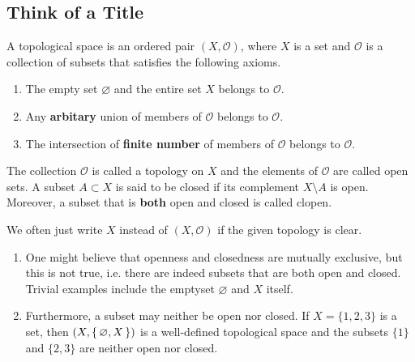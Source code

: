 \subsection{Think of a Title}
\begin{defbox}
    \begin{definition}
        A {\color{maththen}topological space} is an {\color{mathobj}ordered pair} \((X, \mathcal{O})\), where \(X\) is a {\color{mathif}set} and \(\mathcal{O}\) is a {\color{mathif}collection of subsets} that satisfies the following {\color{mathrem}axioms}.
        \begin{enumerate}
            \item The {\color{mathif}empty set} \(\varnothing\) and the {\color{mathif}entire set} \(X\) belongs to \(\mathcal{O}\).
            \item Any \textbf{arbitary} {\color{mathif}union} of members of \(\mathcal{O}\) belongs to \(\mathcal{O}\).
            \item The {\color{mathif}intersection} of \textbf{finite number} of members of \(\mathcal{O}\) belongs to \(\mathcal{O}\).
        \end{enumerate}
        
        The {\color{mathobj}collection} \(\mathcal{O}\) is called a {\color{maththen}topology} on \(X\) and the {\color{mathobj}elements} of \(\mathcal{O}\) are called {\color{maththen}open sets}. A {\color{mathobj}subset} \(A \subset X\) is said to be {\color{maththen}closed} if its {\color{mathif}complement} \(X \setminus A\) is {\color{mathif}open}. Moreover, a {\color{mathobj}subset} that is \textbf{both} {\color{mathif}open} and {\color{mathif}closed} is called {\color{maththen}clopen}.
    \end{definition}
\end{defbox}
%
\begin{rembox}
    \begin{remark}
        We often just write \(X\) instead of \((X, \mathcal{O})\) if the given topology is clear.
    \end{remark}
\end{rembox}
%
\begin{rembox}
    \begin{remark}
        \begin{enumerate}
            \item One might believe that openness and closedness are mutually exclusive, but this is not true, i.e. there are indeed subsets that are both open and closed. Trivial examples include the emptyset \(\varnothing\) and \(X\) itself.
            \item Furthermore, a subset may neither be open nor closed. If \(X = \{1, 2, 3\}\) is a set, then \((X, \left\{\, \varnothing, X \,\right\})\) is a well-defined topological space and the subsets \(\{1\}\) and \(\{2, 3\}\) are neither open nor closed.
        \end{enumerate}
    \end{remark}
\end{rembox}
